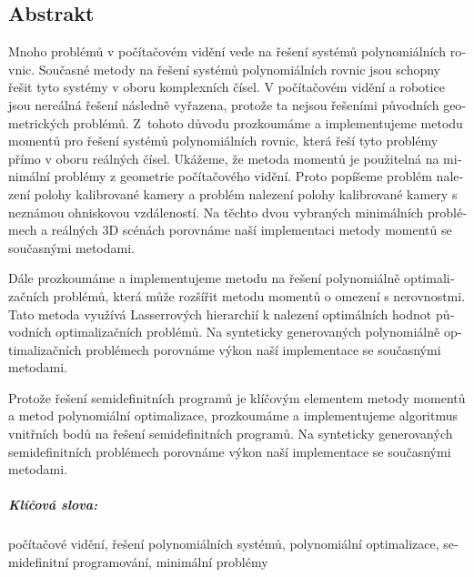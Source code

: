 \begin{otherlanguage}{czech}
\chapter*{Abstrakt}
Mnoho problémů v počítačovém vidění vede na řešení systémů polynomiálních rovnic.
Současné metody na řešení systémů polynomiálních rovnic jsou schopny řešit tyto systémy v oboru komplexních čísel.
V počítačovém vidění a robotice jsou nereálná řešení následně vyřazena, protože ta nejsou řešeními původních geometrických problémů.
Z~tohoto důvodu prozkoumáme a implementujeme metodu momentů pro řešení systémů polynomiálních rovnic, která řeší tyto problémy přímo v oboru reálných čísel.
Ukážeme, že metoda momentů je použitelná na minimální problémy z geometrie počítačového vidění.
Proto popíšeme problém nalezení polohy kalibrované kamery a problém nalezení polohy kalibrované kamery s neznámou ohniskovou vzdáleností.
Na těchto dvou vybraných minimálních problémech a reálných 3D scénách porovnáme naší implementaci metody momentů se sou\-čas\-ný\-mi metodami.

Dále prozkoumáme a implementujeme metodu na řešení polynomiálně optimalizačních problémů, která může rozšířit metodu momentů o omezení s nerovnostmi.
Tato metoda využívá Lasserrových hierarchií k nalezení optimálních hodnot původních optimalizačních problémů.
Na synteticky generovaných polynomiálně optimalizačních prob\-lé\-mech porovnáme výkon naší implementace se současnými metodami.

Protože řešení semidefinitních programů je klíčovým elementem metody momentů a metod polynomiální optimalizace, prozkoumáme a implementujeme algoritmus vnitřních bodů na řešení semidefinitních programů.
Na synteticky generovaných semidefinitních problémech porovnáme výkon naší implementace se současnými metodami.

\paragraph{Klíčová slova:}
počítačové vidění, řešení polynomiálních systémů, polynomiální optimalizace, semidefinitní programování, minimální problémy
\end{otherlanguage}
